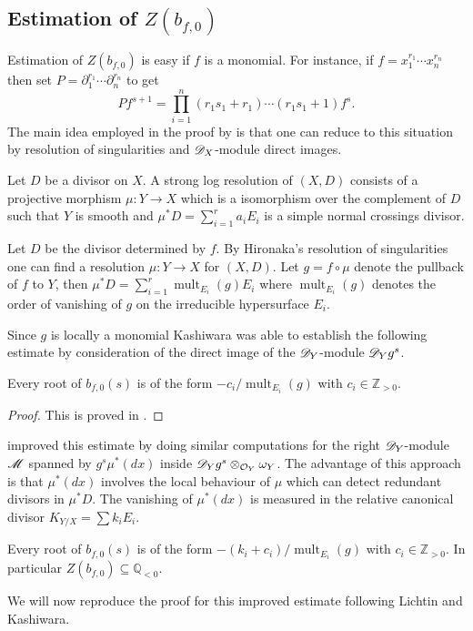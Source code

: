 \subsection{Estimation of $Z(b_{f,0})$}
Estimation of $Z(b_{f,0})$ is easy if $f$ is a monomial.
For instance, if $f = x_1^{r_1}\cdots x_n^{r_n}$ then set $P = \partial_1^{r_1}\cdots \partial_n^{r_n}$ to get
$$P f^{s+1} = \prod_{i=1}^n (r_1 s_1 + r_1)\cdots (r_1 s_1 + 1) f^{s}. $$
The main idea employed in the proof by \cite{kashiwara1976b} is that one can reduce to this situation by resolution of singularities and $\mathscr{D}_X$-module direct images.
\begin{definition}
  Let $D$ be a divisor on $X$. A strong log resolution of $(X,D)$ consists of a projective morphism $\mu:Y\to X$ which is a isomorphism over the complement of $D$ such that $Y$ is smooth and $\mu^*D = \sum_{i=1}^r a_i E_i$ is a simple normal crossings divisor.
\end{definition}
Let $D$ be the divisor determined by $f$.
By Hironaka's resolution of singularities one can find a resolution $\mu:Y\to X$ for $(X,D)$.
Let $g = f\circ \mu$ denote the pullback of $f$ to $Y$, then $\mu^*D = \sum_{i=1}^r \operatorname{mult}_{E_i}(g) E_i$ where $\operatorname{mult}_{E_i}(g)$ denotes the order of vanishing of $g$ on the irreducible hypersurface $E_i$.

Since $g$ is locally a monomial Kashiwara was able to establish the following estimate by consideration of the direct image of the $\mathscr{D}_Y$-module $\mathscr{D}_Y g^s$.
\begin{theorem}
  Every root of $b_{f,0}(s)$ is of the form $ -c_i/\operatorname{mult}_{E_i}(g) $ with $c_i\in \mathbb{Z}_{>0}$.
\end{theorem}
\begin{proof}
  This is proved in \cite{kashiwara1976b}.
\end{proof}
\cite{lichtin1989poles} improved this estimate by doing similar computations for the right $\mathscr{D}_Y$-module $\mathscr{M}$ spanned by $ g^s \mu^*(dx)$ inside $\mathscr{D}_Yg^s\otimes_{\mathcal{O}_Y} \omega_Y$.
The advantage of this approach is that $\mu^*(dx)$ involves the local behaviour of $\mu$ which can detect redundant divisors in $\mu^*D$.
The vanishing of $\mu^*(dx)$ is measured in the relative canonical divisor $K_{Y/X} = \sum k_i E_i$.
\begin{theorem}\label{thm: LichtinEstimate}
  Every root of $b_{f,0}(s)$ is of the form $-(k_i + c_i)/\operatorname{mult}_{E_i}(g)$ with $c_i\in \mathbb{Z}_{>0}$.
  In particular $Z(b_{f,0})\subseteq \mathbb{Q}_{<0}$.
\end{theorem}
We will now reproduce the proof for this improved estimate following Lichtin and Kashiwara.
\\

